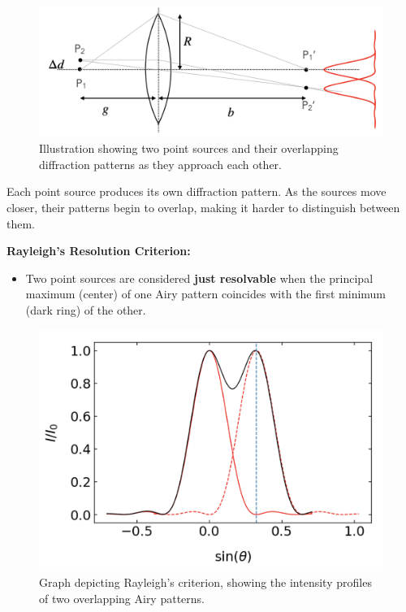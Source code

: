 \documentclass[
  a4paper,
]{book}
\providecommand{\tightlist}{%
  \setlength{\itemsep}{0pt}\setlength{\parskip}{0pt}}
\begin{document}
\begin{figure}[H]

{\centering \includegraphics[width=0.8\linewidth,height=\textheight,keepaspectratio]{wave-optics/img/resolution_definition.png}

}

\caption{Illustration showing two point sources and their overlapping
diffraction patterns as they approach each other.}

\end{figure}%

Each point source produces its own diffraction pattern. As the sources
move closer, their patterns begin to overlap, making it harder to
distinguish between them.

\textbf{Rayleigh's Resolution Criterion:}

\begin{itemize}
\tightlist
\item
  Two point sources are considered \textbf{just resolvable} when the
  principal maximum (center) of one Airy pattern coincides with the
  first minimum (dark ring) of the other.
\end{itemize}

\begin{figure}[H]

{\centering \includegraphics[width=0.5\linewidth,height=\textheight,keepaspectratio]{wave-optics/img/resolution_rayleigh.png}

}

\caption{Graph depicting Rayleigh's criterion, showing the intensity
profiles of two overlapping Airy patterns.}

\end{figure}%
\end{document}
